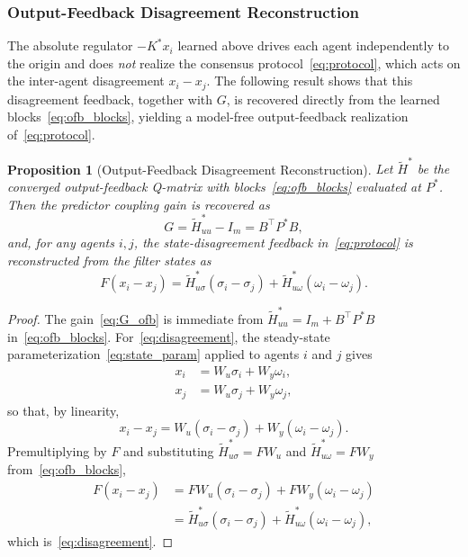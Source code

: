 \documentclass[12pt]{elsarticle}
\newtheorem{proposition}{Proposition}
\theoremstyle{remark}
\begin{document}
\subsubsection{Output-Feedback Disagreement Reconstruction}
\label{subsec:disagreement}

The absolute regulator $-K^*x_i$ learned above drives each agent independently to the origin and does \emph{not} realize the consensus protocol~\eqref{eq:protocol}, which acts on the inter-agent disagreement $x_i - x_j$. The following result shows that this disagreement feedback, together with $G$, is recovered directly from the learned blocks~\eqref{eq:ofb_blocks}, yielding a model-free output-feedback realization of~\eqref{eq:protocol}.

\begin{proposition}[Output-Feedback Disagreement Reconstruction]
\label{prop:disagreement}
Let $\tilde{H}^*$ be the converged output-feedback Q-matrix with blocks~\eqref{eq:ofb_blocks} evaluated at $P^*$. Then the predictor coupling gain is recovered as
\begin{equation}
G = \tilde{H}_{uu}^* - I_m = B^\top P^* B,
\label{eq:G_ofb}
\end{equation}
and, for any agents $i,j$, the state-disagreement feedback in~\eqref{eq:protocol} is reconstructed from the filter states as
\begin{equation}
F(x_i - x_j) = \tilde{H}_{u\sigma}^*(\sigma_i - \sigma_j) + \tilde{H}_{u\omega}^*(\omega_i - \omega_j).
\label{eq:disagreement}
\end{equation}
\end{proposition}

\begin{proof}
The gain~\eqref{eq:G_ofb} is immediate from $\tilde{H}_{uu}^* = I_m + B^\top P^* B$ in~\eqref{eq:ofb_blocks}. For~\eqref{eq:disagreement}, the steady-state parameterization~\eqref{eq:state_param} applied to agents $i$ and $j$ gives
\begin{align*}
x_i &= W_u \sigma_i + W_y \omega_i,\\
x_j &= W_u \sigma_j + W_y \omega_j,
\end{align*}
so that, by linearity,
\begin{equation*}
x_i - x_j = W_u(\sigma_i - \sigma_j) + W_y(\omega_i - \omega_j).
\end{equation*}
Premultiplying by $F$ and substituting $\tilde{H}_{u\sigma}^* = F W_u$ and $\tilde{H}_{u\omega}^* = F W_y$ from~\eqref{eq:ofb_blocks},
\begin{align*}
F(x_i - x_j) &= F W_u(\sigma_i - \sigma_j) + F W_y(\omega_i - \omega_j)\\
&= \tilde{H}_{u\sigma}^*(\sigma_i - \sigma_j) + \tilde{H}_{u\omega}^*(\omega_i - \omega_j),
\end{align*}
which is~\eqref{eq:disagreement}.
\end{proof}
\end{document}

